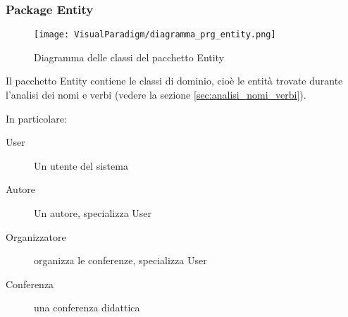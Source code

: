 \subsubsection{Package Entity}
\label{sec:entity}
\begin{figure}[ht] \centering
  \texttt{[image: VisualParadigm/diagramma\_prg\_entity.png]}
  \caption{Diagramma delle classi del pacchetto Entity}
  \label{fig:diagramma_entity}
\end{figure}

Il pacchetto Entity contiene le classi di dominio, cioè
le entità trovate durante l'analisi dei nomi e verbi (vedere la
sezione \ref{sec:analisi_nomi_verbi}).

In particolare:
\begin{description}
\item[User] Un utente del sistema
\item[Autore] Un autore, specializza User
\item[Organizzatore] organizza le conferenze, specializza User
\item[Conferenza] una conferenza didattica
\end{description}
